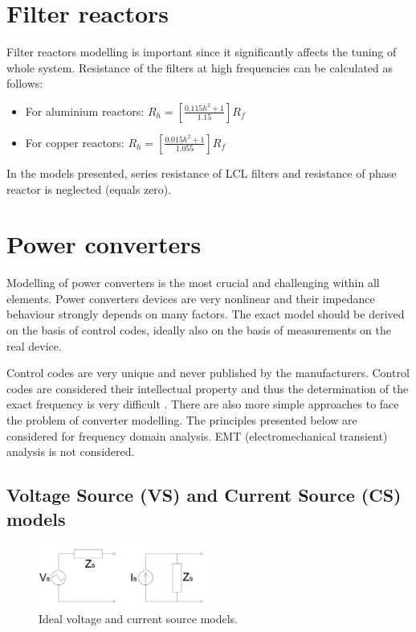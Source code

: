 \documentclass[12pt]{report} %
\begin{document}
\section{Filter reactors}
Filter reactors modelling is important since it significantly affects the tuning of whole system. Resistance of the filters at high frequencies can be calculated as follows:
\begin{itemize}
	\item For aluminium reactors: $R_h=\left [ \frac{0.115h^2+1}{1.15} \right ] R_f$
	\item For copper reactors: $R_h=\left [ \frac{0.015h^2+1}{1.055} \right ] R_f$
\end{itemize}
In the models presented, series resistance of LCL filters and resistance of phase reactor is neglected (equals zero).

\section{Power converters} \label{sec:powerconverters}
Modelling of power converters is the most crucial and challenging within all elements. Power converters devices are very nonlinear and their impedance behaviour strongly depends on many factors. The exact model should be derived on the basis of control codes, ideally also on the basis of measurements on the real device.

Control codes are very unique and never published by the manufacturers. Control codes are considered their intellectual property and thus the determination of the exact frequency is very difficult \cite{borwin1}. There are also more simple approaches to face the problem of converter modelling. The principles presented below are considered for frequency domain analysis. EMT (electromechanical transient) analysis is not considered.

\subsection{Voltage Source  (VS) and Current Source (CS) models} 		\label{sec:powerconverters-vscs}

\begin{figure}[htb]
	\centering
    	\includegraphics[width=0.5\textwidth]{img/theory/vscsmodels.png}
  	\caption{Ideal voltage and current source models.}
  	\label{fig:vscsmodels}
\end{figure}
\FloatBarrier
\end{document}
